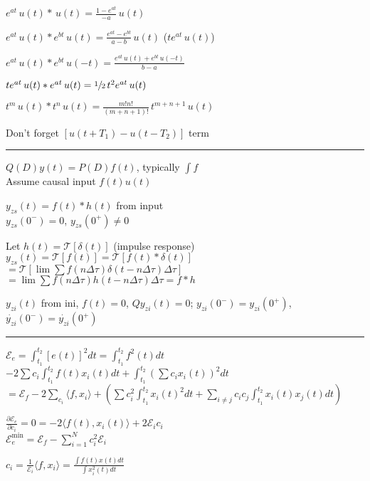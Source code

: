 \documentclass[4pt]{article}
\theoremstyle{definition}
\theoremstyle{definition}
\begin{document}
    $e^{at} \,u(t)* \,u(t) = \frac{1-e^{at}}{-a}\, u(t)$

    $e^{at}\,u(t) * e^{bt}\,u(t) = \frac{e^{at} - e^{bt}}{a - b}\, u(t)$ ($te^{at} \, u(t)$) 

    $e^{at}\, u(t) * e^{bt} \,u(-t) = \frac{e^{at} \, u(t) + e^{bt} \, u(-t)}{b-a}$

    $te^{at}\,u(t) * e^{at} \,u(t)= \sfrac{1}{2} \,t^2e^{at} \, u(t)$

    $t^m\, u(t) * t^n \, u(t) = \frac{m!n!}{(m+n+1)!}\, t^{m+n+1} \, u(t)$

    Don't forget $[u(t+T_1) - u(t-T_2)]$ term
\rule{\linewidth}{0.5pt}
    $Q(D) y(t) = P(D) f(t)$, typically $\int f$\\
    Assume causal input $f(t) u(t)$

    $y_{zs}(t) = f(t) * h(t)$ from input\\    
        $y_{zs}(0^-) = 0$, $y_{zs}(0^+) \neq 0$

        Let $h(t) = \mathcal{T} [\delta (t)]$ (impulse response)
            $y_{zs}(t)=\mathcal{T} [f(t)] = \mathcal{T} [f(t) * \delta (t)]$\\
            $=\mathcal{T}[\lim\sum f(n\Delta\tau) \delta(t - n\Delta\tau) \Delta\tau]$\\
            $=\lim\sum f(n\Delta\tau) h(t-n\Delta\tau)\Delta\tau = f * h$
            
        $y_{zi}(t)$ from ini, $f(t)=0$,
            $Q y_{zi}(t) = 0$;
            $y_{zi}(0^-) = y_{zi}(0^+)$, $\dot{y_{zi}}(0^-) = \dot{y_{zi}}(0^+)$
\rule{\linewidth}{0.5pt}
    $\mathcal{E}_e = \int_{t_1}^{t_2} [e(t)]^2 dt = \int_{t_1}^{t_2} f^2(t)dt$\\
    $- 2\sum c_i \int_{t_1}^{t_2} f(t) x_i(t) dt + \int_{t_1}^{t_2} (\sum c_i x_i(t))^2 dt$\\
    $    = \mathcal{E}_f -  2\sum_{c_i} \langle f, x_i \rangle +
    (\sum c_i^2 \int_{t_1}^{t_2} x_i(t)^2 dt + \sum_{i\neq j} c_i c_j \int_{t_1}^{t_2} x_i(t) x_j(t) dt)$
        
    $\frac{\partial \mathcal{E}_e}{\partial c_i} = 0 = -2 \langle f(t), x_i(t)\rangle + 2\mathcal{E}_i c_i$\\
    $\mathcal{E}_e^{\text{min}} = \mathcal{E}_f - \sum_{i=1}^N c_i^2 \mathcal{E}_i$

    \(c_i = \frac{1}{\mathcal{E}_i}\langle f, x_i\rangle = \frac{\int f(t) x(t) dt}{\int x_i^2(t) dt}\)    
\end{document}
